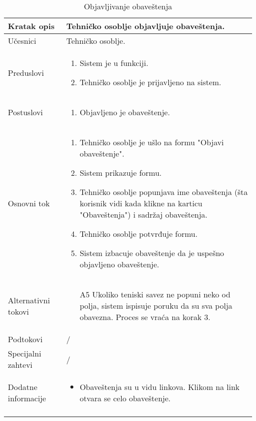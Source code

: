 \documentclass{article}
\begin{document}
    \begin{longtable}{| p{} | p{} |} 
        \hline
            Kratak opis & Tehničko osoblje objavljuje obaveštenja.\\ 
        \hline    
            Učesnici & Tehničko osoblje.\\
        \hline
            Preduslovi & 
                \begin{enumerate}
                    \item Sistem je u funkciji.
                    \item Tehničko osoblje je prijavljeno na sistem.
                \end{enumerate}\\
        \hline  
            Postuslovi & 
                \begin{enumerate}
                    \item Objavljeno je obaveštenje.
                \end{enumerate}\\
        \hline
            Osnovni tok & 
                \begin{enumerate}
                    \item Tehničko osoblje je ušlo na formu "Objavi obaveštenje".
                    \item Sistem prikazuje formu.
                    \item Tehničko osoblje popunjava ime obaveštenja (šta korisnik vidi kada klikne na karticu "Obaveštenja") i sadržaj obaveštenja.
                    \item Tehničko osoblje potvrđuje formu.
                    \item Sistem izbacuje obaveštenje da je uspešno objavljeno obaveštenje.
                \end{enumerate}\\
        \hline
            Alternativni tokovi & 
                \begin{itemize}
                    \item[A5] Ukoliko teniski savez ne popuni neko od polja, sistem ispisuje poruku da su sva polja obavezna. Proces se vraća na korak 3.
                \end{itemize}\\
        \hline
            Podtokovi & /\\
        \hline
            Specijalni zahtevi & /\\
        \hline
            Dodatne informacije & 
                \begin{itemize}
                    \item Obaveštenja su u vidu linkova. Klikom na link otvara se celo obaveštenje.
                \end{itemize}\\
        \hline    
        \caption{Objavljivanje obaveštenja}
    \end{longtable}
\end{document}
